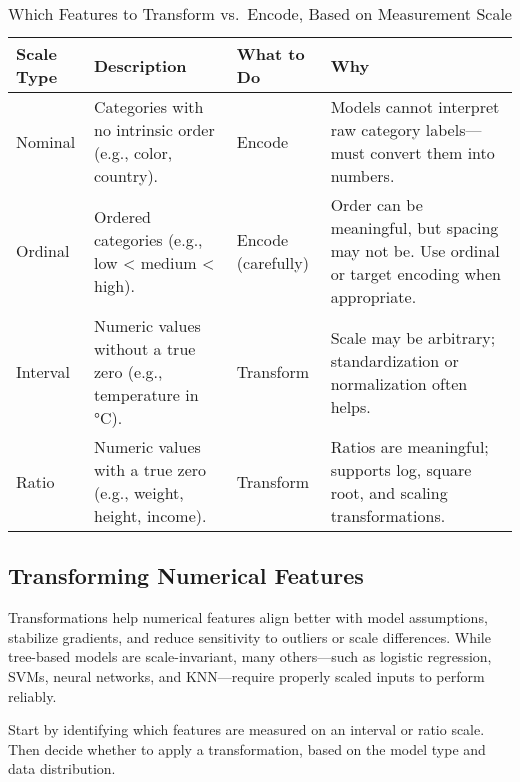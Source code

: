 \documentclass[12pt,openany, draft]{book}
\begin{document}
\begin{table}[H]
\centering
\caption*{Which Features to Transform vs.\ Encode, Based on Measurement Scale}
\vspace{0.5em}
\renewcommand{\arraystretch}{1.4} %
\begin{tabular}{|l|p{3.8cm}|p{3cm}|p{5.2cm}|}
\hline
\textbf{Scale Type} & \textbf{Description} & \textbf{What to Do} & \textbf{Why} \\
\hline
Nominal & Categories with no intrinsic order (e.g., color, country). & Encode & Models cannot interpret raw category labels—must convert them into numbers. \\
\hline
Ordinal & Ordered categories (e.g., low < medium < high). & Encode (carefully) & Order can be meaningful, but spacing may not be. Use ordinal or target encoding when appropriate. \\
\hline
Interval & Numeric values without a true zero (e.g., temperature in °C). & Transform & Scale may be arbitrary; standardization or normalization often helps. \\
\hline
Ratio & Numeric values with a true zero (e.g., weight, height, income). & Transform & Ratios are meaningful; supports log, square root, and scaling transformations. \\
\hline
\end{tabular}
\renewcommand{\arraystretch}{1.0} %
\end{table}


\subsection{Transforming Numerical Features}

Transformations help numerical features align better with model assumptions, stabilize gradients, and reduce sensitivity to outliers or scale differences. While tree-based models are scale-invariant, many others—such as logistic regression, SVMs, neural networks, and KNN—require properly scaled inputs to perform reliably.
\newline

Start by identifying which features are measured on an interval or ratio scale. Then decide whether to apply a transformation, based on the model type and data distribution.
\newline
\end{document}
